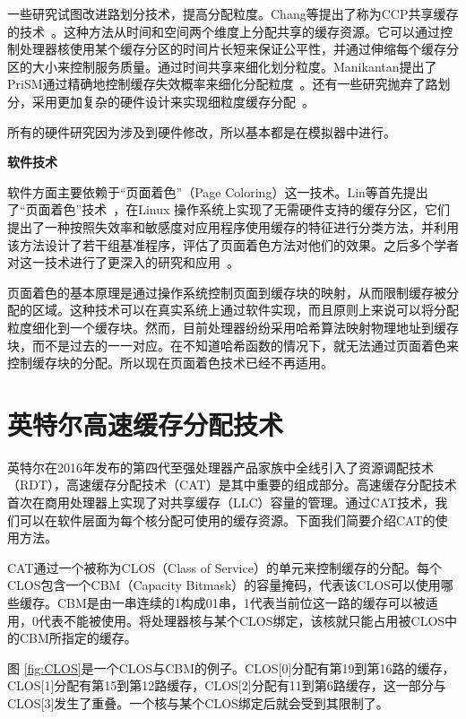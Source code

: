 一些研究试图改进路划分技术，提高分配粒度。Chang等提出了称为CCP共享缓存的技术~\parencite{chang2006cooperative,chang2014cooperative}。这种方法从时间和空间两个维度上分配共享的缓存资源。它可以通过控制处理器核使用某个缓存分区的时间片长短来保证公平性，并通过伸缩每个缓存分区的大小来控制服务质量。通过时间共享来细化划分粒度。Manikantan提出了PriSM通过精确地控制缓存失效概率来细化分配粒度~\parencite{manikantan2012probabilistic}。还有一些研究抛弃了路划分，采用更加复杂的硬件设计来实现细粒度缓存分配~\parencite{sanchez2011vantage}。

所有的硬件研究因为涉及到硬件修改，所以基本都是在模拟器中进行。

\textbf{软件技术}

软件方面主要依赖于“页面着色”（Page Coloring）这一技术。Lin等首先提出了“页面着色”技术~\parencite{lin2008gaining}，在Linux 操作系统上实现了无需硬件支持的缓存分区，它们提出了一种按照失效率和敏感度对应用程序使用缓存的特征进行分类方法，并利用该方法设计了若干组基准程序，评估了页面着色方法对他们的效果。之后多个学者对这一技术进行了更深入的研究和应用~\parencite{zhang2009towards,soares2008reducing,tam2007managing,azimi2009enhancing,lu2009soft}。

页面着色的基本原理是通过操作系统控制页面到缓存块的映射，从而限制缓存被分配的区域。这种技术可以在真实系统上通过软件实现，而且原则上来说可以将分配粒度细化到一个缓存块。然而，目前处理器纷纷采用哈希算法映射物理地址到缓存块，而不是过去的一一对应。在不知道哈希函数的情况下，就无法通过页面着色来控制缓存块的分配。所以现在页面着色技术已经不再适用。

\section{英特尔高速缓存分配技术}
英特尔在2016年发布的第四代至强处理器产品家族中全线引入了资源调配技术（RDT），高速缓存分配技术（CAT）是其中重要的组成部分。高速缓存分配技术首次在商用处理器上实现了对共享缓存（LLC）容量的管理。通过CAT技术，我们可以在软件层面为每个核分配可使用的缓存资源。下面我们简要介绍CAT的使用方法。

CAT通过一个被称为CLOS（Class of Service）的单元来控制缓存的分配。每个CLOS包含一个CBM（Capacity Bitmask）的容量掩码，代表该CLOS可以使用哪些缓存。CBM是由一串连续的1构成01串，1代表当前位这一路的缓存可以被适用，0代表不能被使用。将处理器核与某个CLOS绑定，该核就只能占用被CLOS中的CBM所指定的缓存。

图 \ref{fig:CLOS}是一个CLOS与CBM的例子。CLOS[0]分配有第19到第16路的缓存，CLOS[1]分配有第15到第12路缓存，CLOS[2]分配有11到第6路缓存，这一部分与CLOS[3]发生了重叠。一个核与某个CLOS绑定后就会受到其限制了。

